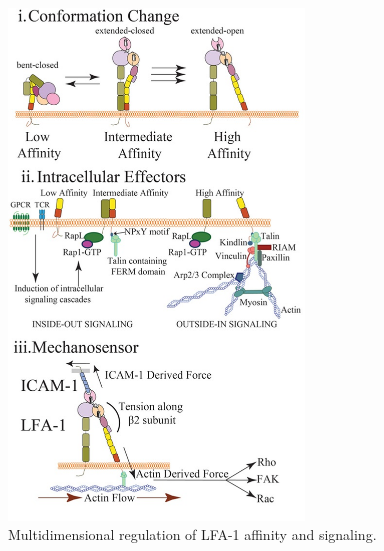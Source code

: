 \begin{figure}[htbp]
	\centering
	\includegraphics[width=0.7\textwidth]{../figures/chapter3/lfa.jpg}
	\caption{Multidimensional regulation of LFA-1 affinity and signaling.}

\end{figure}
